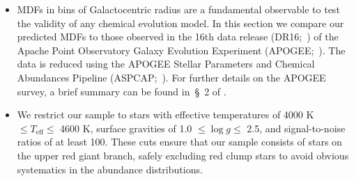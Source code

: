 \documentclass[fleqn, usenatbib]{mnras}
\begin{document}
\begin{itemize} 
	\item MDFs in bins of Galactocentric radius are a fundamental observable 
	to test the validity of any chemical evolution model. In this section we 
	compare our predicted MDFs to those observed in the 16th data release 
	(DR16;~\citealp{Ahumada2020}) of the Apache Point Observatory Galaxy 
	Evolution Experiment (APOGEE;~\citealp{Majewski2017}). The data is 
	reduced using the APOGEE Stellar Parameters and Chemical Abundances 
	Pipeline (ASPCAP;~\citealp{Holtzman2015, GarciaPerez2016}). For further 
	details on the APOGEE survey, a brief summary can be found in~\S~2 of 
	\citet{Weinberg2019}. 

	\item We restrict our sample to stars with effective temperatures of 4000 
	K $\leq T_\text{eff} \leq$ 4600 K, surface gravities of 1.0 
	$\leq \log g \leq$ 2.5, and signal-to-noise ratios of at least 100. These 
	cuts ensure that our sample consists of stars on the upper red giant 
	branch, safely excluding red clump stars to avoid obvious systematics in 
	the abundance distributions. 
\end{itemize}
\end{document}
